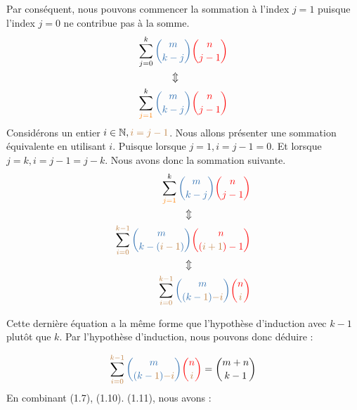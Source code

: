 \documentclass[16pt]{report}
\begin{document}
\begin{multicols*}{2}
\begin{Preuve*}{}{}
        Par conséquent, nous pouvons commencer la sommation à l'index $j = 1$ puisque 
        l'index $j = 0$ ne contribue pas à la somme.
        \begin{align*}
            \sum_{j=0}^{k} \textcolor{myb}{{m \choose k-j}}\textcolor{red}{{n \choose j - 1}} 
             \\ 
            \Updownarrow \quad\quad\quad\quad\quad 
             \\
             \sum_{\textcolor{orange}{j = 1}}^{k} \textcolor{myb}{{m \choose k-j}}\textcolor{red}{{n \choose j - 1}} 
        \end{align*}
        Considérons un entier $i \in \mathbb{N}, \textcolor{brown}{i = j - 1}$. Nous allons présenter 
        une sommation équivalente en utilisant $i$. Puisque lorsque $j = 1, i = j - 1 = 0$. Et lorsque 
        $j = k, i = j - 1 = j - k$. Nous avons donc la sommation suivante. 
        \begin{align*}
             \sum_{\textcolor{orange}{j = 1}}^{k} \textcolor{myb}{{m \choose k-j}}\textcolor{red}{{n \choose j - 1}} 
             \\ 
            \Updownarrow \quad\quad\quad\quad\quad\quad 
             \\
             \sum_{\textcolor{brown}{i = 0}}^{\textcolor{brown}{k-1}} 
             \textcolor{myb}{{m \choose k-(\textcolor{brown}{i-1})}}\textcolor{red}{{n \choose (\textcolor{brown}{i+1})   - 1}} 
             \\ 
            \Updownarrow \quad\quad\quad\quad\quad\quad
             \\
             \sum_{\textcolor{brown}{i = 0}}^{\textcolor{brown}{k-1}} 
             \textcolor{myb}{{m \choose (k-\textcolor{brown}{1})\textcolor{brown}{-i}}}\textcolor{red}{{n \choose \textcolor{brown}{i}}} 
        \end{align*}

        Cette dernière équation a la même forme que l'hypothèse d'induction avec 
        $k - 1$ plutôt que $k$.  Par l'hypothèse d'induction, nous pouvons donc déduire : 

        \begin{align}    
             \sum_{\textcolor{brown}{i = 0}}^{\textcolor{brown}{k-1}} 
             \textcolor{myb}{{m \choose (k-\textcolor{brown}{1})\textcolor{brown}{-i}}}\textcolor{red}{{n \choose \textcolor{brown}{i}}}
             = {m+n \choose k - 1}
        \end{align}
        En combinant (1.7), (1.10). (1.11), nous avons : 


\end{Preuve*}
\end{multicols*}
\end{document}
